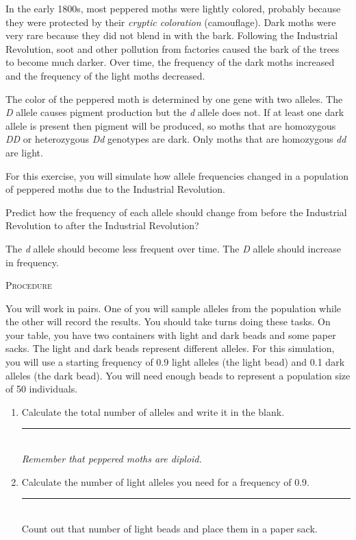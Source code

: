 \documentclass[12pt]{exam}
\newcommand*\AnswerBox[2]{%
    \parbox[t][#1]{0.92\textwidth}{%
    \begin{solution}#2\end{solution}}
    \vspace{\stretch{1}}
}
\newcommand{\allele}[1]{\textit{#1}}
\begin{document}
\begin{questions}
In the early 1800s, most peppered moths were lightly colored, probably because they were protected by their \emph{cryptic coloration} (camouflage). Dark moths were very rare because they did not blend in with the bark. Following the Industrial Revolution, soot and other pollution from factories caused the bark of the trees to become much darker. Over time, the frequency of the dark moths increased and the frequency of the light moths decreased. 

The color of the peppered moth is determined by one gene with two alleles. The \allele{D} allele causes pigment production but the \allele{d} allele does not. If at least one dark allele is present then pigment will be produced, so moths that are homozygous \allele{DD} or heterozygous \allele{Dd} genotypes are dark. Only moths that are homozygous \allele{dd} are light. 

For this exercise, you will simulate how allele frequencies changed in a population of peppered moths due to the Industrial Revolution. 

\question\label{ques:selection_prediction}
Predict how the frequency of each allele should change from before the Industrial Revolution to after the Industrial Revolution?

\AnswerBox{2\baselineskip}{The \allele{d} allele should become less frequent over time. The \allele{D} allele should increase in frequency.}

\textsc{Procedure}

\medskip

You will work in pairs. One of you will sample alleles from the population while the other will record the results. You should take turns doing these tasks.  On your table, you have two containers with light and dark beads and some paper sacks. The light and dark beads represent different alleles. For this simulation, you will use a starting frequency of 0.9 light alleles (the light bead) and 0.1 dark alleles (the dark bead). You will need enough beads to represent a population size of 50 individuals.

\begin{enumerate}

	\item Calculate the total number of alleles and write it in the blank. \hfill \rule{0.5in}{0.4pt}\\ \emph{Remember that peppered moths are diploid.} 
	
	\item Calculate the number of light alleles you need for a frequency of 0.9. \hfill \rule{0.5in}{0.4pt} \\ Count out that number of light beads and place them in a paper sack. 
	

\end{enumerate}
\end{questions}
\end{document}
